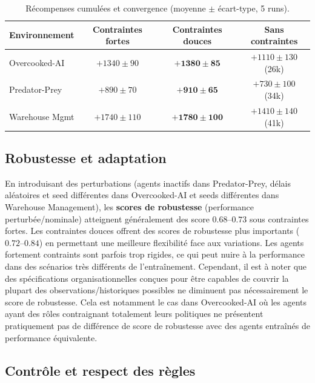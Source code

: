 \begin{table}[h!]
  \centering
  \caption{Récompenses cumulées et convergence (moyenne $\pm$ écart-type, 5 runs).}
  \label{tab:noncyber_rewards}
  \renewcommand{\arraystretch}{1.2}
  \small
  \begin{tabular}{lccc}
    \hline
    \textbf{Environnement} & \textbf{Contraintes fortes} & \textbf{Contraintes douces} & \textbf{Sans contraintes} \\
    \hline
    Overcooked-AI          & $+1340 \pm 90$              & $\mathbf{+1380 \pm 85}$     & $+1110 \pm 130$ (26k)     \\
    Predator-Prey          & $+890 \pm 70$               & $\mathbf{+910 \pm 65}$      & $+730 \pm 100$ (34k)      \\
    Warehouse Mgmt         & $+1740 \pm 110$             & $\mathbf{+1780 \pm 100}$    & $+1410 \pm 140$ (41k)     \\
    \hline
  \end{tabular}
\end{table}

\subsection*{Robustesse et adaptation}

En introduisant des perturbations (agents inactifs dans Predator-Prey, délais aléatoires et seed différentes dans Overcooked-AI et seeds différentes dans Warehouse Management), les \textbf{scores de robustesse} (performance perturbée/nominale) atteignent généralement des score $0.68$–$0.73$ sous contraintes fortes.
Les contraintes douces offrent des scores de robustesse plus importants ($0.72$–$0.84$) en permettant une meilleure flexibilité face aux variations. Les agents fortement contraints sont parfois trop rigides, ce qui peut nuire à la performance dans des scénarios très différents de l'entraînement.
Cependant, il est à noter que des spécifications organisationnelles conçues pour être capables de couvrir la plupart des observations/historiques possibles ne diminuent pas nécessairement le score de robustesse. Cela est notamment le cas dans Overcooked-AI où les agents ayant des rôles contraignant totalement leurs politiques ne présentent pratiquement pas de différence de score de robustesse avec des agents entraînés de performance équivalente.

\subsection*{Contrôle et respect des règles}

